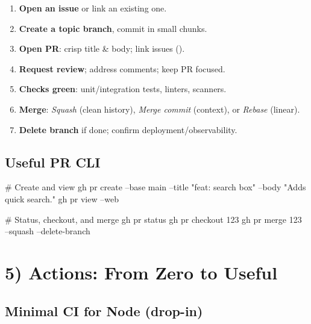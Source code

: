 \documentclass[11pt]{article}
\begin{document}
\begin{enumerate}
  \item \textbf{Open an issue} or link an existing one.
  \item \textbf{Create a topic branch}, commit in small chunks.
  \item \textbf{Open PR}: crisp title \& body; link issues ().
  \item \textbf{Request review}; address comments; keep PR focused.
  \item \textbf{Checks green}: unit/integration tests, linters, scanners.
  \item \textbf{Merge}: \emph{Squash} (clean history), \emph{Merge commit} (context), or \emph{Rebase} (linear).
  \item \textbf{Delete branch} if done; confirm deployment/observability.
\end{enumerate}

\subsection*{Useful PR CLI}

\begin{bashcode}
# Create and view
gh pr create --base main --title "feat: search box" --body "Adds quick search."
gh pr view --web

# Status, checkout, and merge
gh pr status
gh pr checkout 123
gh pr merge 123 --squash --delete-branch
\end{bashcode}

\section*{5) Actions: From Zero to Useful}

\subsection*{Minimal CI for Node (drop-in)}

\end{document}

